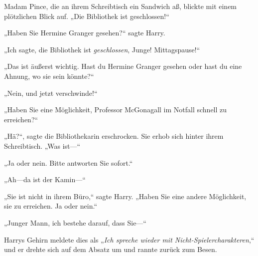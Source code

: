 Madam Pince, die an ihrem Schreibtisch ein Sandwich aß, blickte mit einem plötzlichen Blick auf. „Die Bibliothek ist geschlossen!“

„Haben Sie Hermine Granger gesehen?“ sagte Harry.

„Ich sagte, die Bibliothek ist \emph{geschlossen}, Junge! Mittagspause!“

„Das ist äußerst wichtig. Hast du Hermine Granger gesehen oder hast du eine Ahnung, wo sie sein könnte?“

„Nein, und jetzt verschwinde!“

„Haben Sie eine Möglichkeit, Professor McGonagall im Notfall schnell zu erreichen?“

„Hä?“, sagte die Bibliothekarin erschrocken. Sie erhob sich hinter ihrem Schreibtisch. „Was ist—“

„Ja oder nein. Bitte antworten Sie sofort.“

„Ah—da ist der Kamin—“

„Sie ist nicht in ihrem Büro,“ sagte Harry. „Haben Sie eine andere Möglichkeit, sie zu erreichen. Ja oder nein.“

„Junger Mann, ich bestehe darauf, dass Sie—“

Harrys Gehirn meldete dies als „\emph{Ich spreche wieder mit Nicht-Spielercharakteren},“ und er drehte sich auf dem Absatz um und rannte zurück zum Besen.

